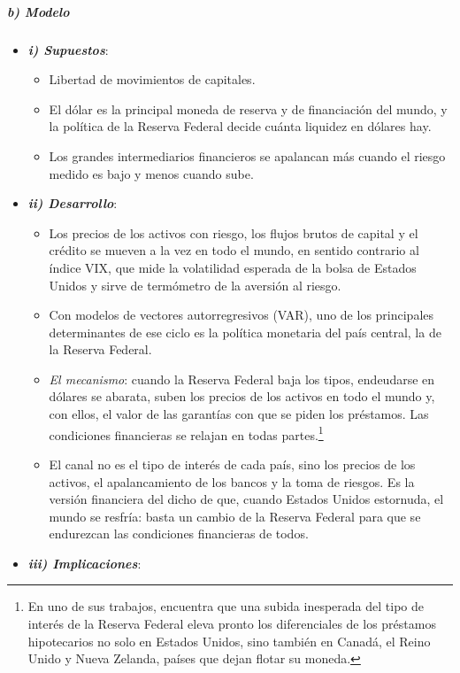 \documentclass[11pt]{article}
\begin{document}
\subparagraph{b) Modelo}

\begin{itemize}
\item \textbf{\emph{i) Supuestos}}:
  \begin{itemize}
  \item Libertad de movimientos de capitales.
  \item El dólar es la principal moneda de reserva y de financiación del mundo, y la política de la Reserva Federal decide cuánta liquidez en dólares hay.
  \item Los grandes intermediarios financieros se apalancan más cuando el riesgo medido es bajo y menos cuando sube.
  \end{itemize}
\item \textbf{\emph{ii) Desarrollo}}:
  \begin{itemize}
  \item Los precios de los activos con riesgo, los flujos brutos de capital y el crédito se mueven a la vez en todo el mundo, en sentido contrario al índice VIX, que mide la volatilidad esperada de la bolsa de Estados Unidos y sirve de termómetro de la aversión al riesgo\nocite{Rey2013Dilema}.
  \item Con modelos de vectores autorregresivos (VAR), uno de los principales determinantes de ese ciclo es la política monetaria del país central, la de la Reserva Federal\nocite{MirandaAgrippinoRey2020}.
  \item \emph{El mecanismo}: cuando la Reserva Federal baja los tipos, endeudarse en dólares se abarata, suben los precios de los activos en todo el mundo y, con ellos, el valor de las garantías con que se piden los préstamos. Las condiciones financieras se relajan en todas partes.\footnote{En uno de sus trabajos,  encuentra\nocite{Economist2016Trilema} que una subida inesperada del tipo de interés de la Reserva Federal eleva pronto los diferenciales de los préstamos hipotecarios no solo en Estados Unidos, sino también en Canadá, el Reino Unido y Nueva Zelanda, países que dejan flotar su moneda.}
  \item El canal no es el tipo de interés de cada país, sino los precios de los activos, el apalancamiento de los bancos y la toma de riesgos. Es la versión financiera del dicho de que, cuando Estados Unidos estornuda, el mundo se resfría: basta un cambio de la Reserva Federal para que se endurezcan las condiciones financieras de todos.
  \end{itemize}
\item \textbf{\emph{iii) Implicaciones}}:

\end{itemize}
\end{document}
